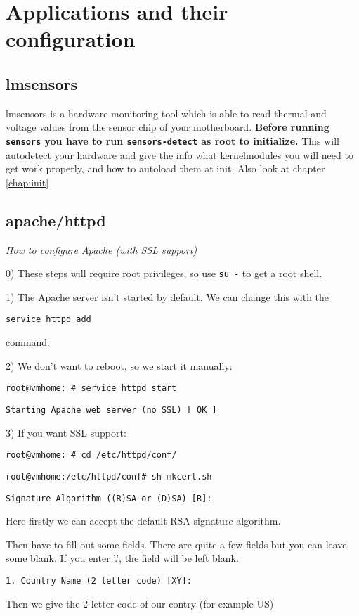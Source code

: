 \chapter{Applications and their configuration}
\section{lmsensors}

lmsensors is a hardware monitoring tool which is able to read thermal and voltage values from the sensor chip of your motherboard.
\textbf{Before running {\tt sensors} you have to run {\tt sensors-detect} as root to initialize.} This will autodetect your hardware and give the info what kernelmodules you will need to get work properly, and how to autoload them at init. Also look at chapter \ref{chap:init}

\section{apache/httpd}

\textit{How to configure Apache (with SSL support)}

0) These steps will require root privileges, so use {\tt su -} to get a root shell.

1) The Apache server isn't started by default. We can change this with the

{\tt service httpd add}

command.

2) We don't want to reboot, so we start it manually:

{\tt root@vmhome:~# service httpd start}

{\tt Starting Apache web server (no SSL)        [  OK  ]}

3) If you want SSL support:

{\tt root@vmhome:~# cd /etc/httpd/conf/}

{\tt root@vmhome:/etc/httpd/conf# sh mkcert.sh}

{\tt Signature Algorithm ((R)SA or (D)SA) [R]:}

Here firstly we can accept the default RSA signature algorithm.

Then have to fill out some fields. There are quite a few fields but you can leave some blank.
If you enter '.', the field will be left blank.

{\tt 1. Country Name             (2 letter code) [XY]:}

Then we give the 2 letter code of our contry (for example US)

